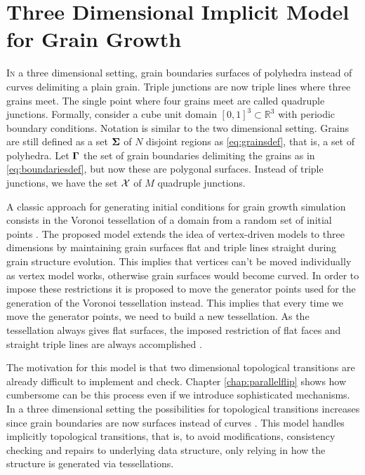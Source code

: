 \chapter{Three Dimensional Implicit Model for Grain Growth}

\lettrine{I}{n} a three dimensional setting, grain boundaries surfaces of polyhedra instead of curves delimiting a plain grain. Triple junctions are now triple lines where three grains meet. The single point where four grains meet are called quadruple junctions. Formally, consider a cube unit domain $[0,1]^3 \subset \mathbb{R}^3$ with periodic boundary conditions. Notation is similar to the two dimensional setting. Grains are still defined as a set $\bm{\Sigma} $ of $N$ disjoint regions as \eqref{eq:grainsdef}, that is, a set of polyhedra. Let $\bm{\Gamma}$ the set of grain boundaries delimiting the grains as in \eqref{eq:boundariesdef}, but now these are polygonal surfaces. Instead of triple junctions, we have the set $\mathcal{X}$ of $M$ quadruple junctions.

A classic approach for generating initial conditions for grain growth simulation consists in the Voronoi tessellation of a domain from a random set of initial points \cite{Barmak2013,BarralesMora2008,Kinderlehrer2006,Lazar2011,Syha2010,torres2015}. The proposed model extends the idea of vertex-driven models to three dimensions by maintaining grain surfaces flat and triple lines straight during grain structure evolution. This implies that vertices can't be moved individually as vertex model works, otherwise grain surfaces would become curved. In order to impose these restrictions it is proposed to move the generator points used for the generation of the Voronoi tessellation instead. This implies that every time we move the generator points, we need to build a new tessellation. As the tessellation always gives flat surfaces, the imposed restriction of flat faces and straight triple lines are always accomplished \cite{sazo2017implicit}.

The motivation for this model is that two dimensional topological transitions are already difficult to implement and check. Chapter \ref{chap:parallelflip} shows how cumbersome can be this process even if we introduce sophisticated mechanisms. In a three dimensional setting the possibilities for topological transitions increases since grain boundaries are now surfaces instead of curves \cite{BarralesMora2008}. This model handles implicitly topological transitions, that is, to avoid modifications, consistency checking and repairs to underlying data structure, only relying in how the structure is generated via tessellations.


